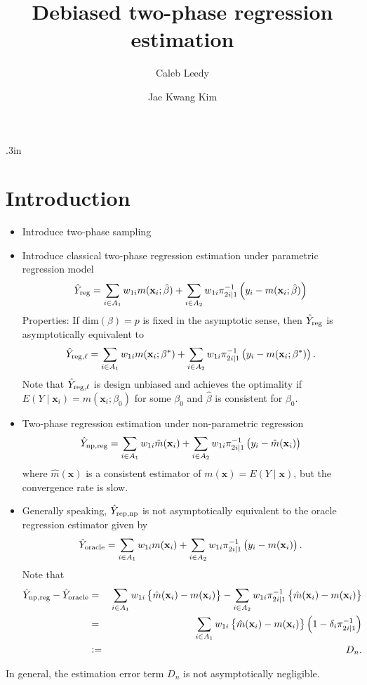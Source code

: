 \documentclass[12pt]{article}
\newcommand{\bx}{\mathbf{x}}
\begin{document}
\title{Debiased two-phase regression estimation}
\author{Caleb Leedy \and Jae Kwang Kim}
\maketitle 

\baselineskip .3in


\section{Introduction}

\begin{itemize}
\item Introduce two-phase sampling
\item Introduce classical two-phase regression estimation under parametric regression model 
$$ \hat{Y}_{\rm reg} = \sum_{i \in A_1} w_{1i} m(\bx_i ; \hat{\beta}) + \sum_{i \in A_2} w_{1i} \pi_{2i \mid 1}^{-1} \left( y_i - m(\bx_i; \hat{\beta}) \right) $$
 Properties: If $\mbox{dim} (\beta)=p$ is fixed in the asymptotic sense, then $\hat{Y}_{\rm reg}$ is asymptotically equivalent to 
$$ \hat{Y}_{\rm reg, \ell} = \sum_{i \in A_1} w_{1i} m(\bx_i ; {\beta}^*) + \sum_{i \in A_2} w_{1i} \pi_{2i \mid 1}^{-1} \left( y_i - m(\bx_i; {\beta}^*) \right). $$
Note that $\hat{Y}_{\rm reg, \ell}$ is design unbiased and achieves the optimality if $E(Y \mid \bx_i)= m(\bx_i; \beta_0)$ for some $\beta_0$ and $\hat{\beta}$ is consistent for $\beta_0$. 

\item Two-phase regression estimation under non-parametric regression 
$$ \hat{Y}_{\rm np, reg} = \sum_{i \in A_1} w_{1i} \hat{m}(\bx_i ) + \sum_{i \in A_2} w_{1i} \pi_{2i \mid 1}^{-1} \left( y_i - \hat{m}(\bx_i) \right) $$
where $\hat{m}(\bx)$ is a consistent estimator of $m(\bx)= E(Y \mid \bx)$, but the convergence rate is slow. 
\item Generally speaking, $\hat{Y}_{\rm rep, np}$ is not asymptotically equivalent to the oracle regression estimator given by 
\begin{equation}
\hat{Y}_{\rm oracle} = \sum_{i \in A_1} w_{1i} {m}(\bx_i ) + \sum_{i \in A_2} w_{1i} \pi_{2i \mid 1}^{-1} \left( y_i - {m}(\bx_i) \right). 
\label{oracle}
\end{equation}
Note that 
\begin{eqnarray*}
 \hat{Y}_{\rm np, reg} - \hat{Y}_{\rm  oracle} &=&\sum_{i \in A_1} w_{1i} \left\{ \hat{m} (\bx_i) - m(\bx_i) \right\} -\sum_{i \in A_2} w_{1i} \pi_{2i|1}^{-1} \left\{ \hat{m} (\bx_i) - m(\bx_i) \right\} \\
 &=& \sum_{i \in A_1} w_{1i} \left\{ \hat{m} (\bx_i) - m(\bx_i) \right\} \left( 1- \delta_i \pi_{2i|1}^{-1} \right) \\
 &:=& D_n .\end{eqnarray*} 
\end{itemize}
In general, the estimation error term $D_n$ is not asymptotically negligible. 
\end{document}
